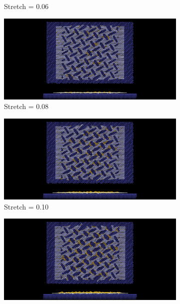 \begin{figure}[H]
\begin{subfigure}[b]{0.49\textwidth}
        \caption{Stretch = 0.06}
        \label{fig:}
    \end{subfigure}
    \begin{subfigure}[b]{0.49\textwidth}
        \centering
        \includegraphics[width=\textwidth]{figures/baseline/contact_vs_stretch/popup/pop_stretch0008.png}
        \caption{Stretch = 0.08}
        \label{fig:}
    \end{subfigure}
    \hfill
    \begin{subfigure}[b]{0.49\textwidth}
        \centering
        \includegraphics[width=\textwidth]{figures/baseline/contact_vs_stretch/popup/pop_stretch0010.png}
        \caption{Stretch = 0.10}
        \label{fig:}
    \end{subfigure}
    \hfill
    \begin{subfigure}[b]{0.49\textwidth}
        \centering
        \includegraphics[width=\textwidth]{figures/baseline/contact_vs_stretch/popup/pop_stretch0012.png}

\end{subfigure}
\end{figure}
